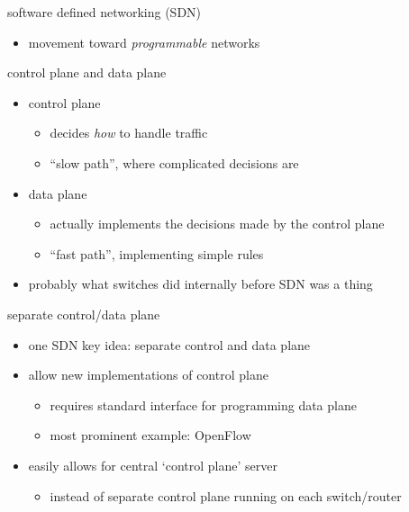 \begin{frame}{software defined networking (SDN)}
    \begin{itemize}
    \item movement toward \textit{programmable} networks
    \end{itemize}
\end{frame}

\begin{frame}{control plane and data plane}
    \begin{itemize}
    \item control plane
        \begin{itemize}
        \item decides \textit{how} to handle traffic
        \item ``slow path'', where complicated decisions are
        \end{itemize}
    \item data plane
        \begin{itemize}
        \item actually implements the decisions made by the control plane
        \item ``fast path'', implementing simple rules
        \end{itemize}
    \vspace{.5cm}
    \item probably what switches did internally before SDN was a thing
    \end{itemize}
\end{frame}

\begin{frame}{separate control/data plane}
    \begin{itemize}
    \item one SDN key idea: separate control and data plane
    \item allow new  implementations of control plane
        \begin{itemize}
        \item requires standard interface for programming data plane
        \item most prominent example: OpenFlow
        \end{itemize}
    \item easily allows for central `control plane' server
        \begin{itemize}
        \item instead of separate control plane running on each switch/router
        \end{itemize}
    \end{itemize}
\end{frame}
